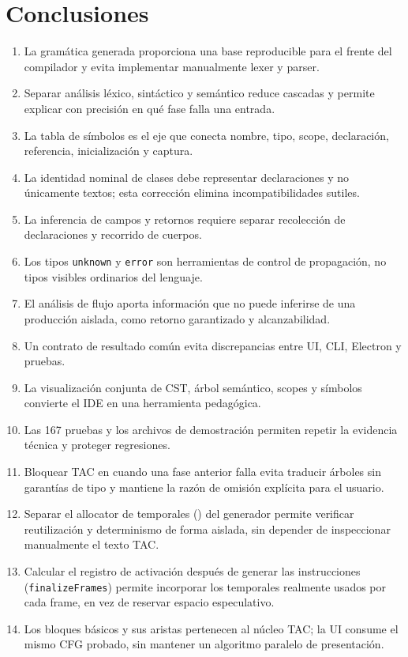 \documentclass[11pt,letterpaper,oneside]{report}
\newcommand{\archivo}[1]{\path{#1}}
\newcommand{\codigo}[1]{\texttt{#1}}
\begin{document}
\chapter{Conclusiones}

\begin{enumerate}
  \item La gramática generada proporciona una base reproducible para el frente del
        compilador y evita implementar manualmente lexer y parser.
  \item Separar análisis léxico, sintáctico y semántico reduce cascadas y permite
        explicar con precisión en qué fase falla una entrada.
  \item La tabla de símbolos es el eje que conecta nombre, tipo, scope, declaración,
        referencia, inicialización y captura.
  \item La identidad nominal de clases debe representar declaraciones y no únicamente
        textos; esta corrección elimina incompatibilidades sutiles.
  \item La inferencia de campos y retornos requiere separar recolección de
        declaraciones y recorrido de cuerpos.
  \item Los tipos \codigo{unknown} y \codigo{error} son herramientas de control de
        propagación, no tipos visibles ordinarios del lenguaje.
  \item El análisis de flujo aporta información que no puede inferirse de una
        producción aislada, como retorno garantizado y alcanzabilidad.
  \item Un contrato de resultado común evita discrepancias entre UI, CLI, Electron y
        pruebas.
  \item La visualización conjunta de CST, árbol semántico, scopes y símbolos convierte
        el IDE en una herramienta pedagógica.
  \item Las 167 pruebas y los archivos de demostración permiten repetir la evidencia
        técnica y proteger regresiones.
  \item Bloquear TAC en \archivo{analyze.ts} cuando una fase anterior falla evita
        traducir árboles sin garantías de tipo y mantiene la razón de omisión
        explícita para el usuario.
  \item Separar el allocator de temporales (\archivo{allocators.ts}) del generador
        permite verificar reutilización y determinismo de forma aislada, sin
        depender de inspeccionar manualmente el texto TAC.
  \item Calcular el registro de activación después de generar las instrucciones
        (\codigo{finalizeFrames}) permite incorporar los temporales realmente usados
        por cada frame, en vez de reservar espacio especulativo.
  \item Los bloques básicos y sus aristas pertenecen al núcleo TAC; la UI consume
        el mismo CFG probado, sin mantener un algoritmo paralelo de presentación.
\end{enumerate}
\end{document}
